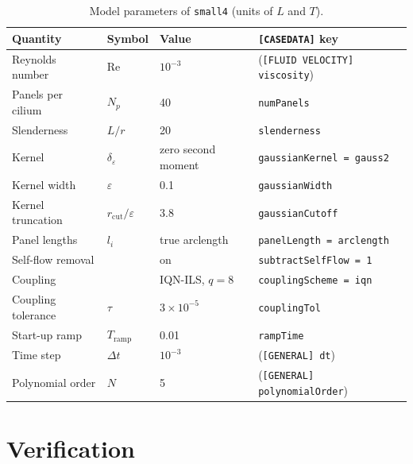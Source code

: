 \documentclass[10pt,a4paper]{article}
\newcommand{\eps}{\varepsilon}
\newcommand{\code}[1]{\texttt{#1}}
\begin{document}
\begin{table}[h]
  \centering
  \small
  \caption{Model parameters of \code{small4} (units of $L$ and $T$).}
  \label{tab:params}
  \begin{tabular}{@{}llll@{}}
    \toprule
    Quantity & Symbol & Value & \code{[CASEDATA]} key \\
    \midrule
    Reynolds number & $\mathrm{Re}$ & $10^{-3}$ & (\code{[FLUID VELOCITY] viscosity}) \\
    Panels per cilium & $N_p$ & 40 & \code{numPanels} \\
    Slenderness & $L/r$ & 20 & \code{slenderness} \\
    Kernel & $\delta_\eps$ & zero second moment & \code{gaussianKernel = gauss2} \\
    Kernel width & $\eps$ & 0.1 & \code{gaussianWidth} \\
    Kernel truncation & $r_\mathrm{cut}/\eps$ & 3.8 & \code{gaussianCutoff} \\
    Panel lengths & $l_i$ & true arclength & \code{panelLength = arclength} \\
    Self-flow removal & & on & \code{subtractSelfFlow = 1} \\
    Coupling & & IQN-ILS, $q = 8$ & \code{couplingScheme = iqn} \\
    Coupling tolerance & $\tau$ & $3\times10^{-5}$ & \code{couplingTol} \\
    Start-up ramp & $T_\mathrm{ramp}$ & 0.01 & \code{rampTime} \\
    Time step & $\Delta t$ & $10^{-3}$ & (\code{[GENERAL] dt}) \\
    Polynomial order & $N$ & 5 & (\code{[GENERAL] polynomialOrder}) \\
    \bottomrule
  \end{tabular}
\end{table}

\section{Verification}
\label{sec:verification}
\end{document}
